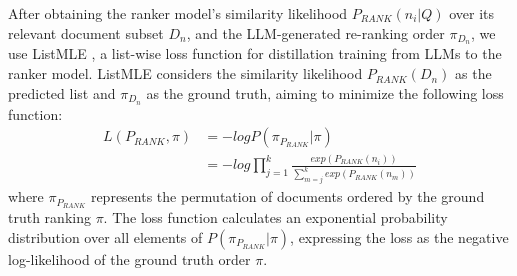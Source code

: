 After obtaining the ranker model's similarity likelihood $P_{RANK}(n_i|Q)$ over its relevant document subset $D_n$, and the LLM-generated re-ranking order $\pi_{D_n}$, we use ListMLE \cite{xia2008listwise}, a list-wise loss function for distillation training from LLMs to the ranker model.
ListMLE considers the similarity likelihood $P_{RANK}(D_n)$ as the predicted list and $\pi_{D_n}$ as the ground truth, aiming to minimize the following loss function:
\begin{equation}
    \begin{aligned}
    L(P_{RANK}, \pi) 
    &= -log P(\pi_{P_{RANK}}|\pi) \\
    &= -log \prod _{j=1}^k \frac{exp(P_{RANK}(n_i))}{\sum_{m=j}^kexp(P_{RANK}(n_m))}
    \end{aligned}
\end{equation}
where $\pi_{P_{RANK}}$ represents the permutation of documents ordered by the ground truth ranking $\pi$. 
The loss function calculates an exponential probability distribution over all elements of $P(\pi_{P_{RANK}}|\pi)$, expressing the loss as the negative log-likelihood of the ground truth order $\pi$.
